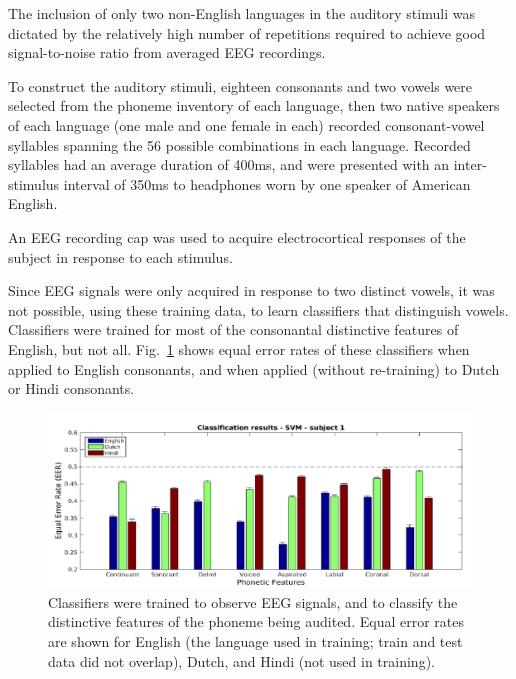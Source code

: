 The inclusion of only two non-English languages in the auditory stimuli
was dictated by the relatively high number of repetitions required to 
achieve good signal-to-noise ratio from averaged EEG recordings.

To construct the auditory stimuli, 
eighteen consonants and two vowels were selected from the phoneme
inventory of each language, then two native speakers of each language
(one male and one female in each) recorded
consonant-vowel syllables spanning the 56 possible combinations in
each language.  Recorded syllables had an average duration of 400ms,
and were presented with an inter-stimulus interval of 350ms to
headphones worn by one speaker of American English.

An EEG recording
cap was used to acquire electrocortical responses of the subject in
response to each stimulus.


Since EEG signals were only acquired in response to two distinct
vowels, it was not possible, using these training data, to learn
classifiers that distinguish vowels.  Classifiers were trained for
most of the consonantal distinctive features of English, but not all.
Fig.~\ref{fig:eeg_svm_eers} shows equal error rates of these
classifiers when applied to English consonants, and when applied
(without re-training) to Dutch or Hindi consonants.

\begin{figure}
  \centerline{\includegraphics[width=5in]{../figs/diliberto_svmresults.png}}
  \caption{Classifiers were trained to observe EEG signals, and to
    classify the distinctive features of the phoneme being audited.
    Equal error rates are shown for English (the language used in
    training; train and test data did not overlap), Dutch, and Hindi
    (not used in training).}
  \label{fig:eeg_svm_eers}
\end{figure}


